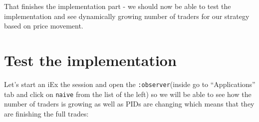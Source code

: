 \documentclass[
  oneside]{book}
\begin{document}
That finishes the implementation part - we should now be able to test the implementation and see dynamically growing number of traders for our strategy based on price movement.

\hypertarget{test-the-implementation-2}{%
\section{Test the implementation}\label{test-the-implementation-2}}

Let's start an iEx the session and open the \texttt{:observer}(inside go to ``Applications'' tab and click on \texttt{naive} from the list of the left) so we will be able to see how the number of traders is growing as well as PIDs are changing which means that they are finishing the full trades:
\end{document}
